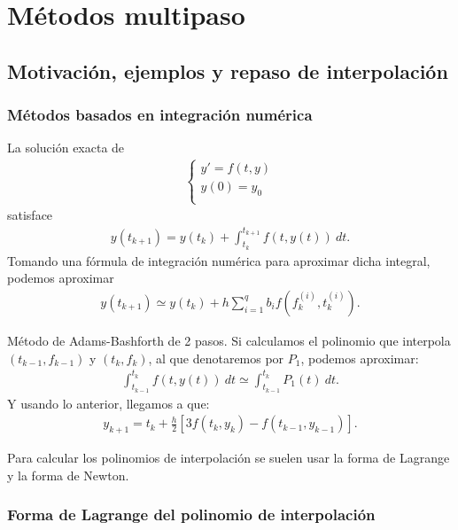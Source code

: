 \chapter{Métodos multipaso}

\section{Motivación, ejemplos y repaso de interpolación}

\subsection{Métodos basados en integración numérica}

\noindent La solución exacta de
\begin{align*}
    \left\{ \begin{array}{lcc}
             y' = f(t,y)\\
             y(0) = y_0 \\
             \end{array}
   \right.
\end{align*}
satisface 
\begin{align*}
    y(t_{k+1}) = y(t_k) + \int_{t_k}^{t_{k+1}} f(t,y(t)) \ dt.
\end{align*}
Tomando una fórmula de integración numérica para aproximar dicha integral, podemos aproximar
\begin{align*}
    y(t_{k+1}) \simeq y(t_k) +h\sum_{i=1}^{q} b_if\left( f_k^{(i)}, t_k^{(i)} \right).
\end{align*}

\begin{ejemplo}
Método de Adams-Bashforth de 2 pasos. Si calculamos el polinomio que interpola $(t_{k-1},f_{k-1})$ y $(t_k,f_k)$, al que denotaremos por $P_1$, podemos aproximar: 
\begin{align*}
    \int_{t_{k-1}}^{t_k} f(t,y(t)) \ dt \simeq  \int_{t_{k-1}}^{t_k} P_1(t) \ dt.
\end{align*}
Y usando lo anterior, llegamos a que:
\begin{align*}
    y_{k+1} = t_k + \frac{h}{2}[3f(t_k,y_k) - f(t_{k-1},y_{k-1})].
\end{align*}
\end{ejemplo}

\noindent Para calcular los polinomios de interpolación se suelen usar la forma de Lagrange y la forma de Newton.

\subsection{Forma de Lagrange del polinomio de interpolación}

